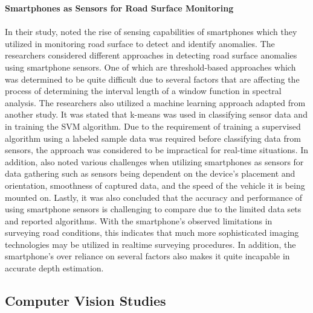 \noindent\textbf{\large Smartphones as Sensors for Road Surface Monitoring} \\\\
In their study,  noted the rise of sensing capabilities of smartphones which they utilized in monitoring road surface to detect and identify anomalies. The researchers considered different approaches in detecting road surface anomalies using smartphone sensors. One of which are threshold-based approaches which was determined to be quite difficult  due to several factors that are affecting the process of determining the interval length of a window function in spectral analysis. The researchers also utilized a machine learning approach adapted from another study. It was stated that k-means was used in classifying sensor data and in training the SVM algorithm. Due to the requirement of training a supervised algorithm using a labeled sample data was required before classifying data from sensors, the approach was considered to be impractical for real-time situations. In addition,  also noted various challenges when utilizing smartphones as sensors for data gathering such as sensors being dependent on the device’s placement and orientation, smoothness of captured data, and the speed of the vehicle it is being mounted on. Lastly, it was also concluded that the accuracy and performance of using smartphone sensors is challenging to compare due to the limited data sets and reported algorithms. With the smartphone's observed limitations in surveying road conditions, this indicates that much more sophisticated imaging technologies may be utilized in realtime surveying procedures. In addition, the smartphone's over reliance on several factors also makes it quite incapable in accurate depth estimation.

\subsection{Computer Vision Studies}

